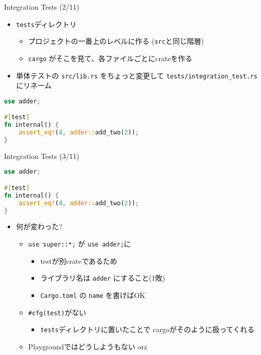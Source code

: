 \documentclass[cjk,14pt,xcolor=dvipsnames,table,dvipdfmx,professional font,t,fragile]{beamer}
\begin{document}
\begin{frame}[fragile]{Integration Tests (2/11)}
 \begin{itemize}
  \item \texttt{tests}ディレクトリ
	\begin{itemize}
	 \item プロジェクトの一番上のレベルに作る (\texttt{src}と同じ階層)
	 \item \texttt{cargo} がそこを見て、各ファイルごとにcrateを作る
	\end{itemize}
  \item 単体テストの \texttt{src/lib.rs} をちょっと変更して
	\texttt{tests/integration\_test.rs}にリネーム
 \end{itemize}
 {\scriptsize
 \begin{lstlisting}[language=Rust,style=boxed,style=colouredRust]
use adder;

#[test]
fn internal() {
    assert_eq!(4, adder::add_two(2));
}\end{lstlisting}}
\end{frame}

\begin{frame}[fragile]{Integration Tests (3/11)}
 \mbox{}
 {\scriptsize
 \begin{lstlisting}[language=Rust,style=boxed,style=colouredRust]
use adder;

#[test]
fn internal() {
    assert_eq!(4, adder::add_two(2));
}\end{lstlisting}}
\begin{itemize}
 \item 何が変わった?
       \begin{itemize}
	\item \verb|use super::*;| が \verb|use adder;|に
	      \begin{itemize}
	       \item testが別crateであるため
	       \item ライブラリ名は \texttt{adder} にすること(1敗)
	       \item \texttt{Cargo.toml} の \texttt{name} を書けばOK
	      \end{itemize}
	\item \verb|#cfg(test)|がない
	      \begin{itemize}
	       \item \texttt{tests}ディレクトリに置いたことで
		     cargoがそのように扱ってくれる
	      \end{itemize}
	      \pause
	\item Playgroundではどうしようもない orz
       \end{itemize}
\end{itemize}
\end{frame}
\end{document}
